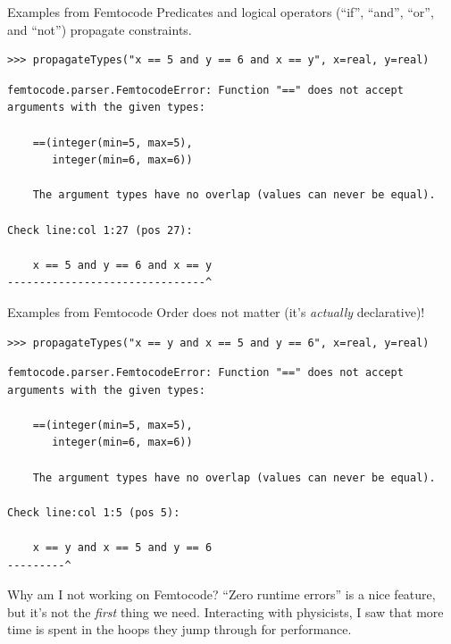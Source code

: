 \documentclass[aspectratio=169]{beamer}
\begin{document}
\begin{frame}[fragile]{Examples from Femtocode}
\vspace{0.5 cm}
Predicates and logical operators (``if'', ``and'', ``or'', and ``not'') propagate constraints.

\small
\begin{verbatim}
>>> propagateTypes("x == 5 and y == 6 and x == y", x=real, y=real)
\end{verbatim}
{\color{red}
\begin{verbatim}
femtocode.parser.FemtocodeError: Function "==" does not accept
arguments with the given types:

    ==(integer(min=5, max=5),
       integer(min=6, max=6))

    The argument types have no overlap (values can never be equal).

Check line:col 1:27 (pos 27):

    x == 5 and y == 6 and x == y
-------------------------------^
\end{verbatim}}
\end{frame}

\begin{frame}[fragile]{Examples from Femtocode}
\vspace{0.5 cm}
Order does not matter (it's {\it actually} declarative)!

\small
\begin{verbatim}
>>> propagateTypes("x == y and x == 5 and y == 6", x=real, y=real)
\end{verbatim}
{\color{red}
\begin{verbatim}
femtocode.parser.FemtocodeError: Function "==" does not accept
arguments with the given types:

    ==(integer(min=5, max=5),
       integer(min=6, max=6))

    The argument types have no overlap (values can never be equal).

Check line:col 1:5 (pos 5):

    x == y and x == 5 and y == 6
---------^
\end{verbatim}}
\end{frame}

\begin{frame}{Why am I not working on Femtocode?}
\large
\vspace{0.5 cm}
``Zero runtime errors'' is a nice feature, but it's not the {\it first} thing we need. Interacting with physicists, I saw that more time is spent in the hoops they jump through for performance.



\end{frame}
\end{document}
